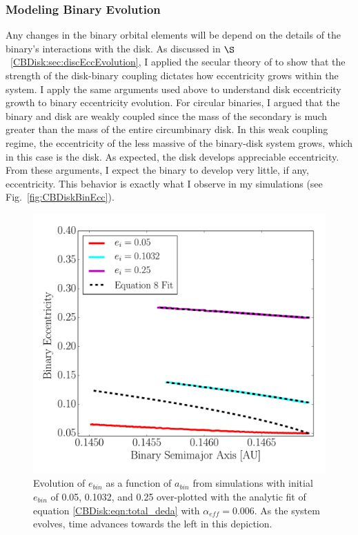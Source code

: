 
\subsubsection{Modeling Binary Evolution} \label{CBDisk:sec:ModelBinaryEvolution}

Any changes in the binary orbital elements will be depend on the
details of the binary's interactions with the disk.  As discussed in
$\S$~\ref{CBDisk:sec:discEccEvolution}, I applied the secular theory of
\citet{Papaloizou2001} to show that the strength of the disk-binary
coupling dictates how eccentricity grows within the system.   I apply the same arguments used above to understand disk eccentricity growth to binary eccentricity evolution.  For circular binaries, I argued that the binary and disk are weakly coupled since the mass of the secondary is much greater than the mass of the entire circumbinary disk.  In this weak coupling regime, the eccentricity of the less massive of the binary-disk system grows, which in this case is the disk.  As expected, the disk develops appreciable eccentricity.  From these arguments, I expect the binary to develop very little, if any, eccentricity.  This behavior is exactly what I observe in my simulations (see Fig.~\ref{fig:CBDiskBinEcc}).

\begin{figure}
	\includegraphics[width=\columnwidth]{f8}
    \caption{Evolution of $e_{bin}$ as a
      function of $a_{bin}$ from simulations with initial $e_{bin}$ of
      0.05, 0.1032, and 0.25 over-plotted with the analytic fit of
      equation \ref{CBDisk:eqn:total_deda} with $\alpha_{eff} = 0.006$.
      As the system evolves, time advances towards the left in this
      depiction.}
    \label{fig:CBDiskFitEqn}
\end{figure}

